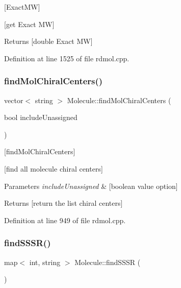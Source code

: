 \mbox{[}Exact\+MW\mbox{]} 

\mbox{[}get Exact MW\mbox{]}

\begin{DoxyReturn}{Returns}
\mbox{[}double Exact MW\mbox{]} 
\end{DoxyReturn}


Definition at line 1525 of file rdmol.\+cpp.

\mbox{\label{class_molecule_af6c321c6236876f4e4a16cc8ff5ddee9}} 
\subsubsection{\texorpdfstring{find\+Mol\+Chiral\+Centers()}{findMolChiralCenters()}}
{\footnotesize\ttfamily vector$<$ string $>$ Molecule\+::find\+Mol\+Chiral\+Centers (\begin{DoxyParamCaption}\item[{bool}]{include\+Unassigned }\end{DoxyParamCaption})}



\mbox{[}find\+Mol\+Chiral\+Centers\mbox{]} 

\mbox{[}find all molecule chiral centers\mbox{]}


\begin{DoxyParams}{Parameters}
{\em include\+Unassigned} & \mbox{[}boolean value option\mbox{]} \\
\hline
\end{DoxyParams}
\begin{DoxyReturn}{Returns}
\mbox{[}return the list chiral centers\mbox{]} 
\end{DoxyReturn}


Definition at line 949 of file rdmol.\+cpp.

\mbox{\label{class_molecule_a553c6c6f1543156da2ff00c859f6b508}} 
\subsubsection{\texorpdfstring{find\+S\+S\+S\+R()}{findSSSR()}}
{\footnotesize\ttfamily map$<$ int, string $>$ Molecule\+::find\+S\+S\+SR (\begin{DoxyParamCaption}{ }\end{DoxyParamCaption})}



